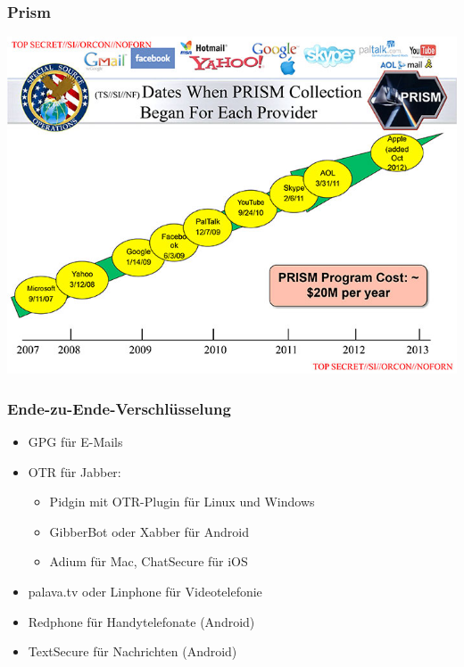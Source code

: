\documentclass[12pt]{beamer}
\begin{document}
\begin{frame}
    \frametitle{Prism}
    \begin{center}
      \includegraphics[height=0.7\textheight]{img/prism.jpg}
    \end{center}
\end{frame}

\begin{frame}
  \frametitle{Ende-zu-Ende-Verschlüsselung}
  \begin{itemize}
    \item<1-> GPG für E-Mails
    \item<2-> OTR für Jabber:
      \begin{itemize}
        \item Pidgin mit OTR-Plugin für Linux und Windows
        \item GibberBot oder Xabber für Android
        \item Adium für Mac, ChatSecure für iOS
      \end{itemize}
    \item<3-> palava.tv oder Linphone für Videotelefonie
    \item<4-> Redphone für Handytelefonate (Android)
    \item<5-> TextSecure für Nachrichten (Android)
  \end{itemize}
\end{frame}
\end{document}
